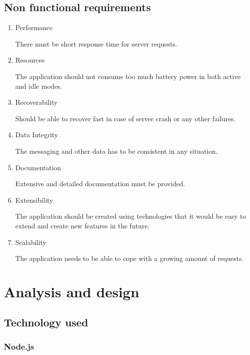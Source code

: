 \documentclass[thesis=M,english]{FITthesis}[2012/10/20]
\begin{document}
\section{Non functional requirements}

\begin{enumerate}

\item{Performance} 

There must be short response time for server requests.

\item{Resources} 

The application should not consume too much battery power in both active and idle modes.

\item{Recoverability}

Should be able to recover fast in case of server crash or any other failures.

\item{Data Integrity}

The messaging and other data has to be consistent in any situation.

\item{Documentation}

Extensive and detailed documentation must be provided.

\item{Extensibility}

The application should be created using technologies that it would be easy to extend and create new features in the future.

\item{Scalability}

The application needs to be able to cope with a growing amount of requests.
\end{enumerate}

\chapter{Analysis and design}
\section{Technology used}
\subsection{Node.js}
\end{document}
